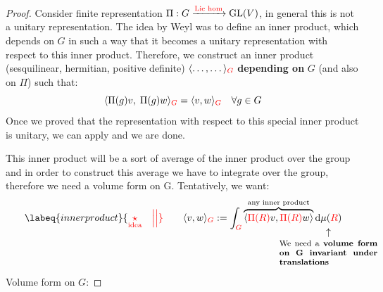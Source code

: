 \documentclass[../main.tex]{subfiles}
\begin{document}
\begin{proof}
Consider finite representation $\Pi:G\xrightarrow[]{{\color{red}\text{Lie hom}}}\text{GL}(V)$, in general this is not a unitary representation. The idea by Weyl was to define an inner product, which depends on $G$ in such a way that it becomes a unitary representation with respect to this inner product. Therefore, we construct an inner product (sesquilinear, hermitian, positive definite) $\langle\dots,\dots\rangle_{\color{red}G}$ \textbf{depending on} $G$ (and also on $\Pi$) such that:
\[
\langle\Pi(g)v,\;\Pi(g)w\rangle_{\color{red}G}=\langle v,w \rangle_{\color{red}G} \quad \forall g\in G
\]
Once we proved that the representation with respect to this special inner product is unitary, we can apply  and we are done.

This inner product will be a sort of average of the inner product over the group and in order to construct this average we have to integrate over the group, therefore we need a volume form on G. Tentatively, we want:
\begin{equation}
\labeq{innerproduct}
{\color{red}\underset{\textrm{idea}}{\star}\quad \Big|\Big|}\qquad\langle v,w \rangle_{\color{red}G}:=\int_{\color{red}G}\overbrace{\langle {\color{red}\Pi(R)}v,{\color{red}\Pi(R)}w\rangle}^{\text{any inner product}}\dd\mu\underset{\mathclap{\tikz \node {$\uparrow$} node [below=1ex] {\footnotesize \parbox{3.5cm}{We need a \textbf{volume form on G invariant under translations}}};}}({\color{red}R})
\end{equation}
 Volume form on $G$:


\end{proof}
\end{document}
